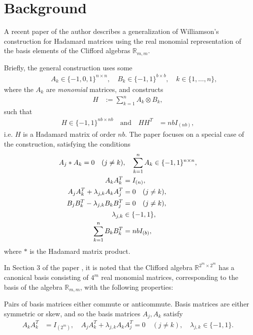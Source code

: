 \documentclass[12pt,a4paper]{article}
\newcommand{\mb}[1]{\mathbb{#1}}
\newcommand{\R}{\mb{R}}
\begin{document}
\section{Background}\label{sec-Background}
A recent paper of the author \cite{Leo14Constructions} describes a generalization of
Williamson's construction for Hada\-mard matrices \cite{Wil44}
using the real monomial representation of the basis elements of the Clifford algebras $\R_{m,m}$.

Briefly, the general construction uses some
\begin{align*}
%
\quad &A_k \in \{-1,0,1\}^{n \times n}, \quad B_k \in \{-1,1\}^{b \times b},
\quad k \in \{1,\ldots,n\},
%
\end{align*}
%
where the $A_k$ are \emph{monomial} matrices,
and constructs
%
\begin{align}
%
H &:= \sum_{k=1}^n A_k \otimes B_k,
\tag{H0}
%
\end{align}
%
such that
%
\begin{align}
%
H \in \{-1,1\}^{n b \times n b}
\quad
\text{and}
\quad
H H^T &= n b I_{(n b)},
\tag{H1}
%
\end{align}
%
i.e. $H$ is a Hada\-mard matrix of order $n b$.
The paper \cite{Leo14Constructions} focuses on a special case of the construction,
satisfying the conditions
%
\begin{align}
%
 A_j \ast A_k = 0 \quad (j \neq k)&, \quad \sum_{k=1}^n A_k \in \{-1,1\}^{n \times n},
\notag
\\
 A_k A_k^T &= I_{(n)},
\notag
\\
 A_j A_k^T + \lambda_{j,k} A_k A_j^T &= 0 \quad (j \neq k),
\label{constructions-4}
\\
 B_j B_k^T - \lambda_{j,k} B_k B_j^T &= 0 \quad (j \neq k),
\notag
\\
 \lambda_{j,k} &\in \{-1,1\},
\notag
\\
\sum_{k=1}^n  B_k B_k^T &= n b I_{(b)},
\notag
%
\end{align}
%
where $\ast$ is the Hada\-mard matrix product.

In Section 3 of the paper  \cite{Leo14Constructions},
it is noted that the Clifford algebra $\R^{2^m \times 2^m}$ has a canonical basis consisting of $4^m$ real monomial matrices,
corresponding to the basis of the algebra $\R_{m,m}$, with the following properties:

Pairs of basis matrices either commute or anticommute.
Basis matrices are either symmetric or skew,
and so the basis matrices $A_j, A_k$ satisfy
%
\begin{align}
%
 A_k A_k^T &= I_{(2^m)},
\quad
 A_j A_k^T + \lambda_{j,k} A_k A_j^T = 0 \quad (j \neq k),
\quad
\lambda_{j,k} \in \{-1,1\}.
%
\label{A-property-1}
\end{align}
\end{document}
